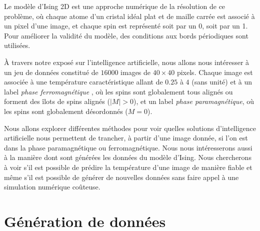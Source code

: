 \documentclass[11pt, parskip=half]{scrartcl} %
\begin{document}
Le modèle d'Ising 2D est une approche numérique de la résolution de ce problème, où chaque atome d'un cristal idéal plat et de maille carrée est associé à un pixel d'une image, et chaque spin est représenté soit par un 0, soit par un 1. Pour améliorer la validité du modèle, des conditions aux bords périodiques sont utilisées.


À travers notre exposé sur l'intelligence artificielle, nous allons nous intéresser à un jeu de données constitué de $16 000$ images de $40 \times 40$ pixels. Chaque image est associée à une température caractéristique allant de $0.25$ à $4$ (sans unité) et à un label \textit{phase ferromagnétique} , où les spins sont globalement tous alignés ou forment des îlots de spins alignés ($|M| > 0$), et un label \textit{phase paramagnétique}, où les spins sont globalement désordonnés ($M = 0$).


Nous allons explorer différentes méthodes pour voir quelles solutions d'intelligence artificielle nous permettent de trancher, à partir d'une image donnée, si l'on est dans la phase paramagnétique ou ferromagnétique. Nous nous intéresserons aussi à la manière dont sont générées les données du modèle d'Ising. Nous chercherons à voir s'il est possible de prédire la température d'une image de manière fiable et même s'il est possible de générer de nouvelles données sans faire appel à une simulation numérique coûteuse.

\section{Génération de données}
\end{document}
